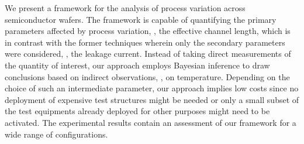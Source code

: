 We present a framework for the analysis of process variation across semiconductor wafers.
The framework is capable of quantifying the primary parameters affected by process variation, \eg, the effective channel length, which is in contrast with the former techniques wherein only the secondary parameters were considered, \eg, the leakage current.
Instead of taking direct measurements of the quantity of interest, our approach employs Bayesian inference to draw conclusions based on indirect observations, \eg, on temperature.
Depending on the choice of such an intermediate parameter, our approach implies low costs since no deployment of expensive test structures might be needed or only a small subset of the test equipments already deployed for other purposes might need to be activated.
The experimental results contain an assessment of our framework for a wide range of configurations.
